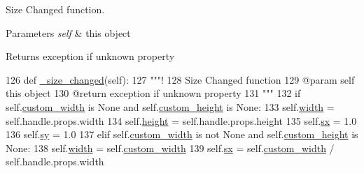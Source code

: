 Size Changed function. 


\begin{DoxyParams}{Parameters}
{\em self} & this object \\
\hline
\end{DoxyParams}
\begin{DoxyReturn}{Returns}
exception if unknown property 
\end{DoxyReturn}

\begin{DoxyCode}
126     \textcolor{keyword}{def }\hyperlink{classvisualizer_1_1svgitem_1_1SvgItem_a565dbade860935217740bfa89230d201}{\_size\_changed}(self):
127         \textcolor{stringliteral}{"""!}
128 \textcolor{stringliteral}{        Size Changed function}
129 \textcolor{stringliteral}{        @param self this object}
130 \textcolor{stringliteral}{        @return exception if unknown property}
131 \textcolor{stringliteral}{        """}
132         \textcolor{keywordflow}{if} self.\hyperlink{classvisualizer_1_1svgitem_1_1SvgItem_af260ac13861942bed817d7d02fef736b}{custom\_width} \textcolor{keywordflow}{is} \textcolor{keywordtype}{None} \textcolor{keywordflow}{and} self.\hyperlink{classvisualizer_1_1svgitem_1_1SvgItem_a333ecccefa1eb44ec43998fd24f8efe0}{custom\_height} \textcolor{keywordflow}{is} \textcolor{keywordtype}{None}:
133             self.\hyperlink{classvisualizer_1_1svgitem_1_1SvgItem_a6576a5ad9cd06ff7670b143135eb1b9d}{width} = self.handle.props.width
134             self.\hyperlink{classvisualizer_1_1svgitem_1_1SvgItem_a87072079be0f8db0c514a93ff03c6989}{height} = self.handle.props.height
135             self.\hyperlink{classvisualizer_1_1svgitem_1_1SvgItem_aeaf1e7bd3449c434fcd0a3ac90678bfa}{sx} = 1.0
136             self.\hyperlink{classvisualizer_1_1svgitem_1_1SvgItem_a89f6c42408a99a3cd6ea2611752d9b86}{sy} = 1.0
137         \textcolor{keywordflow}{elif} self.\hyperlink{classvisualizer_1_1svgitem_1_1SvgItem_af260ac13861942bed817d7d02fef736b}{custom\_width} \textcolor{keywordflow}{is} \textcolor{keywordflow}{not} \textcolor{keywordtype}{None} \textcolor{keywordflow}{and} self.\hyperlink{classvisualizer_1_1svgitem_1_1SvgItem_a333ecccefa1eb44ec43998fd24f8efe0}{custom\_height} \textcolor{keywordflow}{is} \textcolor{keywordtype}{None}:
138             self.\hyperlink{classvisualizer_1_1svgitem_1_1SvgItem_a6576a5ad9cd06ff7670b143135eb1b9d}{width} = self.\hyperlink{classvisualizer_1_1svgitem_1_1SvgItem_af260ac13861942bed817d7d02fef736b}{custom\_width}
139             self.\hyperlink{classvisualizer_1_1svgitem_1_1SvgItem_aeaf1e7bd3449c434fcd0a3ac90678bfa}{sx} = self.\hyperlink{classvisualizer_1_1svgitem_1_1SvgItem_af260ac13861942bed817d7d02fef736b}{custom\_width} / self.handle.props.width

\end{DoxyCode}
